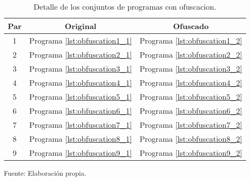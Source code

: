 \begin{table}[H]
\centering
\begin{tabular}{|c||c||c|}
\hline
Par & Original & Ofuscado \\ \hline
1 & Programa \ref{lst:obfuscation1_1} & Programa \ref{lst:obfuscation1_2} \\ \hline
2 & Programa \ref{lst:obfuscation2_1} & Programa \ref{lst:obfuscation2_2} \\ \hline
3 & Programa \ref{lst:obfuscation3_1} & Programa \ref{lst:obfuscation3_2} \\ \hline
4 & Programa \ref{lst:obfuscation4_1} & Programa \ref{lst:obfuscation4_2} \\ \hline
5 & Programa \ref{lst:obfuscation5_1} & Programa \ref{lst:obfuscation5_2} \\ \hline
6 & Programa \ref{lst:obfuscation6_1} & Programa \ref{lst:obfuscation6_2} \\ \hline
7 & Programa \ref{lst:obfuscation7_1} & Programa \ref{lst:obfuscation7_2} \\ \hline
8 & Programa \ref{lst:obfuscation8_1} & Programa \ref{lst:obfuscation8_2} \\ \hline
9 & Programa \ref{lst:obfuscation9_1} & Programa \ref{lst:obfuscation9_2} \\ \hline
\end{tabular}
\caption{Detalle de los conjuntos de programas con ofuscacion.}
Fuente: Elaboración propia.
\label{firstTest}
\end{table}
